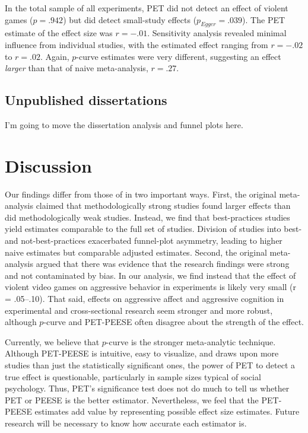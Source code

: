 \documentclass[man]{apa6}
\begin{document}
In the total sample of all experiments, PET did not detect an effect of violent games ($p = .942$) but did detect small-study effects ($p_{Egger} = .039$). The PET estimate of the effect size was $r = -.01$. Sensitivity analysis revealed minimal influence from individual studies, with the estimated effect ranging from $r = -.02$ to $r = .02$. Again, $p$-curve estimates were very different, suggesting an effect {\em larger} than that of naive meta-analysis, $r = .27$.

\subsection{Unpublished dissertations}
I'm going to move the dissertation analysis and funnel plots here.

\section{Discussion}
Our findings differ from those of \citet{Anderson:etal:2010} in two important ways. First, the original meta-analysis claimed that methodologically strong studies found larger effects than did methodologically weak studies. Instead, we find that best-practices studies yield estimates comparable to the full set of studies. Division of studies into best- and not-best-practices exacerbated funnel-plot asymmetry, leading to higher naive estimates but comparable adjusted estimates. Second, the original meta-analysis argued that there was evidence that the research findings were strong and not contaminated by bias. In our analysis, we find instead that the effect of violent video games on aggressive behavior in experiments is likely very small (r = .05--.10). That said, effects on aggressive affect and aggressive cognition in experimental and cross-sectional research seem stronger and more robust, although $p$-curve and PET-PEESE often disagree about the strength of the effect.

Currently, we believe that $p$-curve is the stronger meta-analytic technique. Although PET-PEESE is intuitive, easy to visualize, and draws upon more studies than just the statistically significant ones, the power of PET to detect a true effect is questionable, particularly in sample sizes typical of social psychology. Thus, PET's significance test does not do much to tell us whether PET or PEESE is the better estimator. Nevertheless, we feel that the PET-PEESE estimates add value by representing possible effect size estimates. Future research will be necessary to know how accurate each estimator is.
\end{document}
